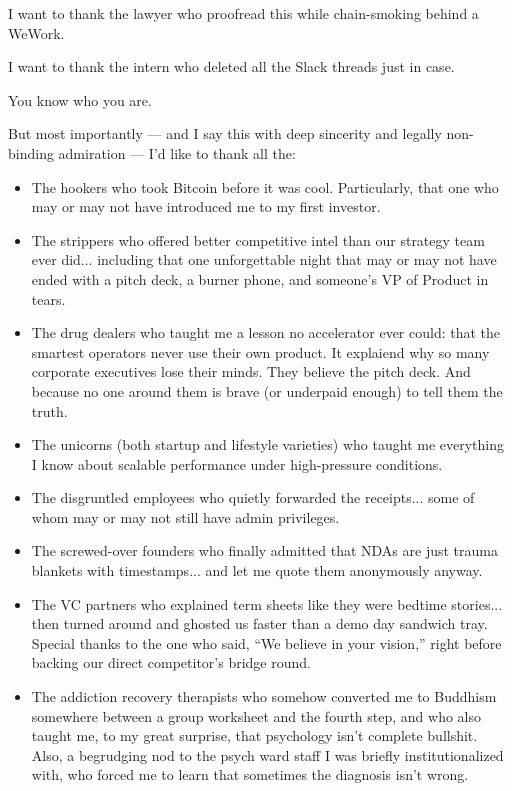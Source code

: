\documentclass{article}
\begin{document}
  I want to thank the lawyer who proofread this while chain-smoking behind a WeWork.  

  I want to thank the intern who deleted all the Slack threads just in case.

  You know who you are.

  But most importantly — and I say this with deep sincerity and legally non-binding admiration —  
  I’d like to thank all the:
  
  \begin{itemize}
    \item The hookers who took Bitcoin before it was cool. Particularly, that one who may or may not 
    have introduced me to my first investor.
    
    \item The strippers who offered better competitive intel than our strategy team ever did... 
    including that one unforgettable night that may or may not have ended with a pitch deck, a burner phone, 
    and someone's VP of Product in tears.
    
    \item The drug dealers who taught me a lesson no accelerator ever could:  
    that the smartest operators never use their own product.  
    It explaiend why so many corporate executives lose their minds.  
    They believe the pitch deck.  
    And because no one around them is brave (or underpaid enough) to tell them the truth.
    
    \item The unicorns (both startup and lifestyle varieties) who taught me everything I know about scalable performance under high-pressure conditions.
    
    \item The disgruntled employees who quietly forwarded the receipts... some of whom may or may not still have admin privileges.
    
    \item The screwed-over founders who finally admitted that NDAs are just trauma blankets with timestamps... and let me quote them anonymously anyway.

    \item The VC partners who explained term sheets like they were bedtime stories...  
    then turned around and ghosted us faster than a demo day sandwich tray.  
    Special thanks to the one who said, ``We believe in your vision,''
    right before backing our direct competitor's bridge round.

    \item The addiction recovery therapists who somehow converted me to Buddhism  
    somewhere between a group worksheet and the fourth step,  
    and who also taught me, to my great surprise, that psychology isn’t complete bullshit.  
    Also, a begrudging nod to the psych ward staff I was briefly institutionalized with,  
    who forced me to learn that sometimes the diagnosis isn’t wrong.
  \end{itemize}
  
\end{document}
